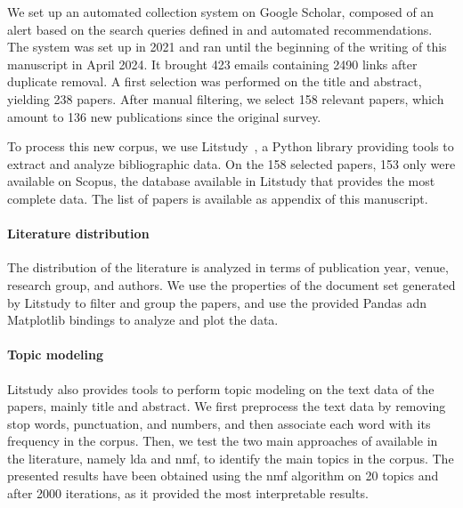 We set up an automated collection system on Google Scholar, composed of an alert based on the search queries defined in  and automated recommendations.
The system was set up in 2021 and ran until the beginning of the writing of this manuscript in April 2024. 
It brought 423 emails containing 2490 links after duplicate removal.
A first selection was performed on the title and abstract, yielding 238 papers.
After manual filtering, we select 158 relevant papers, which amount to 136 new publications since the original survey.

To process this new corpus, we use Litstudy~\cite{heldens_litstudyPythonpackage_2022}, a Python library providing tools to extract and analyze bibliographic data.
On the 158 selected papers, 153 only were available on Scopus, the database available in Litstudy that provides the most complete data.
The list of papers is available as appendix of this manuscript.

\paragraph{Literature distribution}

The distribution of the literature is analyzed in terms of publication year, venue, research group, and authors.
We use the properties of the document set generated by Litstudy to filter and group the papers, and use the provided Pandas adn Matplotlib bindings to analyze and plot the data.

\paragraph{Topic modeling}

Litstudy also provides tools to perform topic modeling on the text data of the papers, mainly title and abstract.
We first preprocess the text data by removing stop words, punctuation, and numbers, and then associate each word with its frequency in the corpus.
Then, we test the two main approaches of available in the literature, namely \gls{lda} and \gls{nmf}, to identify the main topics in the corpus.
The presented results have been obtained using the \gls{nmf} algorithm on 20 topics and after 2000 iterations, as it provided the most interpretable results.

